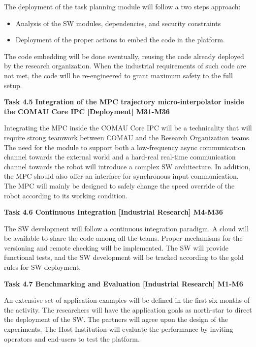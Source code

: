 \begin{planactivitybody}
The deployment of the task planning module will follow a two steps
approach:

\begin{itemize}
\item
  Analysis of the SW modules, dependencies, and security constraints
\item
  Deployment of the proper actions to embed the code in the platform.
\end{itemize}

The code embedding will be done eventually, reusing the code already
deployed by the research organization. When the industrial requirements
of such code are not met, the code will be re-engineered to grant
maximum safety to the full setup.

\plantaskskip
\textbf{Task 4.5 Integration of the MPC trajectory micro-interpolator
inside the COMAU Core IPC {[}Deployment{]} M31-M36}

Integrating the MPC inside the COMAU Core IPC will be a technicality
that will require strong teamwork between COMAU and the Research
Organization teams. The need for the module to support both a
low-frequency async communication channel towards the external world and
a hard-real real-time communication channel towards the robot will
introduce a complex SW architecture. In addition, the MPC should also
offer an interface for synchronous input communication. The MPC will
mainly be designed to safely change the speed override of the robot
according to its working condition.

\plantaskskip
\textbf{Task 4.6 Continuous Integration {[}Industrial Research{]}
M4-M36}

The SW development will follow a continuous integration paradigm. A
cloud will be available to share the code among all the teams. Proper
mechanisms for the versioning and remote checking will be implemented.
The SW will provide functional tests, and the SW development will be
tracked according to the gold rules for SW deployment.

\plantaskskip
\textbf{Task 4.7 Benchmarking and Evaluation {[}Industrial Research{]}
M1-M6}

An extensive set of application examples will be defined in the first
six months of the activity. The researchers will have the application
goals as north-star to direct the deployment of the SW. The partners
will agree upon the design of the experiments. The Host Institution will
evaluate the performance by inviting operators and end-users to test the
platform.
\end{planactivitybody}

